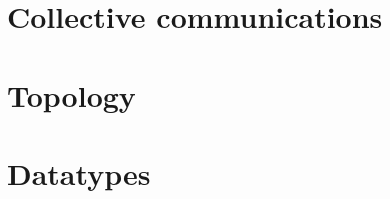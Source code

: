 \documentclass[aspectratio=43]{beamer}
\begin{document}
\section{Collective communications}
\section{Topology}
\section{Datatypes}

\end{document}

